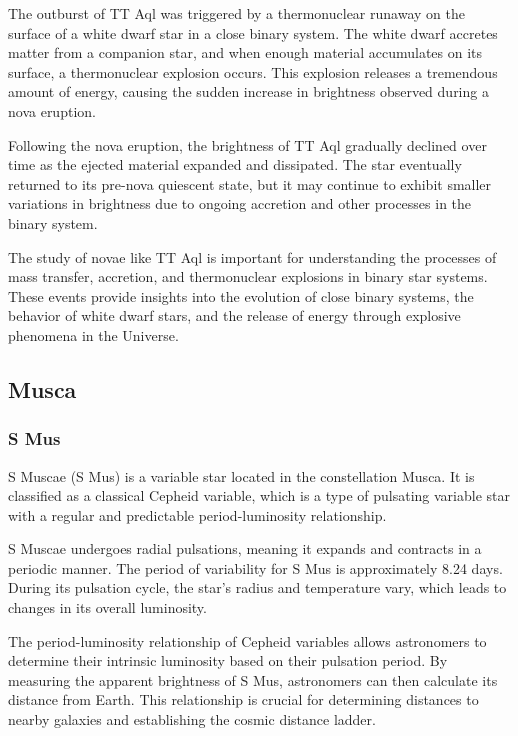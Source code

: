 The outburst of TT Aql was triggered by a thermonuclear runaway on the surface of a white dwarf star in a close binary system. The white dwarf accretes matter from a companion star, and when enough material accumulates on its surface, a thermonuclear explosion occurs. This explosion releases a tremendous amount of energy, causing the sudden increase in brightness observed during a nova eruption.

Following the nova eruption, the brightness of TT Aql gradually declined over time as the ejected material expanded and dissipated. The star eventually returned to its pre-nova quiescent state, but it may continue to exhibit smaller variations in brightness due to ongoing accretion and other processes in the binary system.

The study of novae like TT Aql is important for understanding the processes of mass transfer, accretion, and thermonuclear explosions in binary star systems. These events provide insights into the evolution of close binary systems, the behavior of white dwarf stars, and the release of energy through explosive phenomena in the Universe.



\subsection{Musca}

\subsubsection*{ S Mus }
S Muscae (S Mus) is a variable star located in the constellation Musca. It is classified as a classical Cepheid variable, which is a type of pulsating variable star with a regular and predictable period-luminosity relationship.

S Muscae undergoes radial pulsations, meaning it expands and contracts in a periodic manner. The period of variability for S Mus is approximately 8.24 days. During its pulsation cycle, the star's radius and temperature vary, which leads to changes in its overall luminosity.

The period-luminosity relationship of Cepheid variables allows astronomers to determine their intrinsic luminosity based on their pulsation period. By measuring the apparent brightness of S Mus, astronomers can then calculate its distance from Earth. This relationship is crucial for determining distances to nearby galaxies and establishing the cosmic distance ladder.

